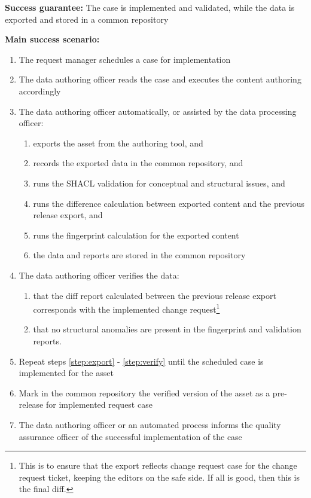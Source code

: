 	\textbf{Success guarantee:} The case is implemented and validated, while the data is exported and stored in a common repository
	
	\textbf{Main success scenario:}
	
	\begin{enumerate}
		\item The request manager schedules a case for implementation
		\item The data authoring officer reads the case and executes the content authoring accordingly
		\item \label{step:export} The data authoring officer automatically, or assisted by the data processing officer:
		\begin{enumerate}
			\item exports the asset from the authoring tool, and
			\item records the exported data in the common repository, and 
			\item runs the SHACL validation for conceptual and structural issues, and
			\item runs the difference calculation between exported content and the previous release export, and
			\item runs the fingerprint calculation for the exported content
			\item the data and reports are stored in the common repository 
		\end{enumerate}		
		\item \label{step:verify} The data authoring officer verifies the data: 
		\begin{enumerate}
			\item that the diff report calculated between the previous release export corresponds with the implemented change request\footnote{This is to ensure that the export reflects change request case for the change request ticket, keeping the editors on the safe side. If all is good, then this is the final diff.}
			\item that no structural anomalies are present in the fingerprint and validation reports.
		\end{enumerate}		 
		\item Repeat steps \ref{step:export} - \ref{step:verify} until the scheduled case is implemented for the asset
		\item Mark in the common repository the verified version of the asset as a pre-release for implemented request case
		\item The data authoring officer or an automated process informs the quality assurance officer of the successful implementation of the case	
	\end{enumerate}
	
